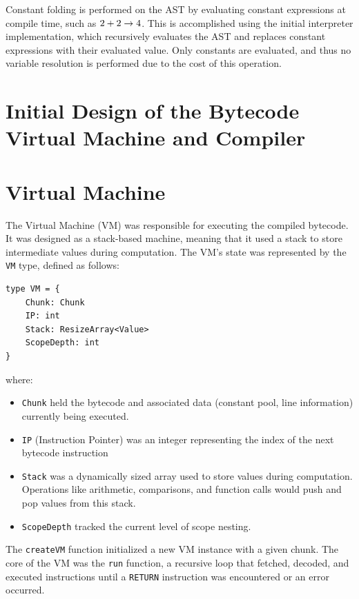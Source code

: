 Constant folding is performed on the AST by evaluating constant expressions at compile time, such as $2 + 2 \rightarrow 4$.
This is accomplished using the initial interpreter implementation, which recursively evaluates the AST and replaces
constant expressions with their evaluated value.
Only constants are evaluated, and thus no variable resolution is performed due to the cost of this operation.

\section{Initial Design of the Bytecode Virtual Machine and Compiler}\label{sec:initial-design-of-the-bytecode-virtual-machine-and-compiler}



\section{Virtual Machine}\label{sec:virtual-machine2}

The Virtual Machine (VM) was responsible for executing the compiled bytecode. 
It was designed as a stack-based machine, meaning that it used a stack to store intermediate values during computation. 
The VM's state was represented by the \texttt{VM} type, defined as follows:

\begin{verbatim}
type VM = {
    Chunk: Chunk
    IP: int
    Stack: ResizeArray<Value>
    ScopeDepth: int  
}
\end{verbatim}

\noindent where:

\begin{itemize}
    \item \texttt{Chunk} held the bytecode and associated data (constant pool, line information) currently being executed.
    \item \texttt{IP} (Instruction Pointer) was an integer representing the index of the next bytecode instruction
    \item \texttt{Stack} was a dynamically sized array used to store values during computation.
    Operations like arithmetic, comparisons, and function calls would push and pop values from this stack.
    \item \texttt{ScopeDepth} tracked the current level of scope nesting.
\end{itemize}

The \texttt{createVM} function initialized a new VM instance with a given chunk.
The core of the VM was the \texttt{run} function, a recursive loop that fetched, decoded, and executed instructions until a \texttt{RETURN} instruction was encountered or an error occurred.

